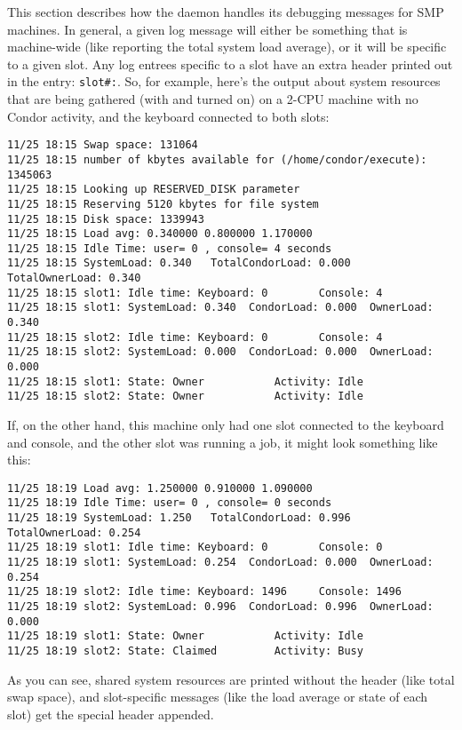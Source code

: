 This section describes how the  daemon
handles its debugging messages for SMP machines.
In general, a given log message will either be something that is
machine-wide (like reporting the total system load average), or it
will be specific to a given slot.
Any log entrees specific to a slot have an extra
header printed out in the entry: \texttt{slot\#:}.  
So, for example, here's the output about system resources that are
being gathered (with  and  turned on) on
a 2-CPU machine with no Condor activity, and the keyboard connected to
both slots:
\begin{verbatim}
11/25 18:15 Swap space: 131064
11/25 18:15 number of kbytes available for (/home/condor/execute): 1345063
11/25 18:15 Looking up RESERVED_DISK parameter
11/25 18:15 Reserving 5120 kbytes for file system
11/25 18:15 Disk space: 1339943
11/25 18:15 Load avg: 0.340000 0.800000 1.170000
11/25 18:15 Idle Time: user= 0 , console= 4 seconds
11/25 18:15 SystemLoad: 0.340   TotalCondorLoad: 0.000  TotalOwnerLoad: 0.340
11/25 18:15 slot1: Idle time: Keyboard: 0        Console: 4
11/25 18:15 slot1: SystemLoad: 0.340  CondorLoad: 0.000  OwnerLoad: 0.340
11/25 18:15 slot2: Idle time: Keyboard: 0        Console: 4
11/25 18:15 slot2: SystemLoad: 0.000  CondorLoad: 0.000  OwnerLoad: 0.000
11/25 18:15 slot1: State: Owner           Activity: Idle
11/25 18:15 slot2: State: Owner           Activity: Idle
\end{verbatim}

If, on the other hand, this machine only had one slot
connected to the keyboard and console, and the other slot was running a
job, it might look something like this:
\begin{verbatim}
11/25 18:19 Load avg: 1.250000 0.910000 1.090000
11/25 18:19 Idle Time: user= 0 , console= 0 seconds
11/25 18:19 SystemLoad: 1.250   TotalCondorLoad: 0.996  TotalOwnerLoad: 0.254
11/25 18:19 slot1: Idle time: Keyboard: 0        Console: 0
11/25 18:19 slot1: SystemLoad: 0.254  CondorLoad: 0.000  OwnerLoad: 0.254
11/25 18:19 slot2: Idle time: Keyboard: 1496     Console: 1496
11/25 18:19 slot2: SystemLoad: 0.996  CondorLoad: 0.996  OwnerLoad: 0.000
11/25 18:19 slot1: State: Owner           Activity: Idle
11/25 18:19 slot2: State: Claimed         Activity: Busy
\end{verbatim}

As you can see, shared system resources are printed without the header
(like total swap space), and slot-specific messages (like the load
average or state of each slot) get the special header appended.  


